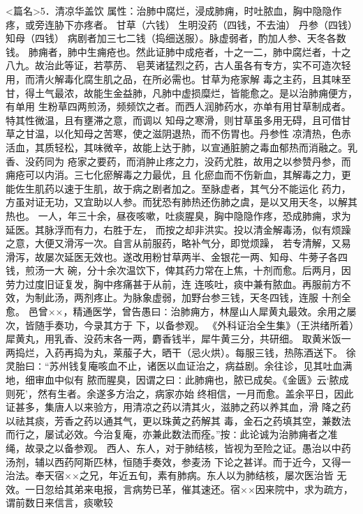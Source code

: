 \documentclass[a4paper,12pt,UTF8,twoside]{ctexbook}
\begin{document}
<篇名>5．清凉华盖饮
属性：治肺中腐烂，浸成肺痈，时吐脓血，胸中隐隐作疼，或旁连胁下亦疼者。 
甘草（六钱） 生明没药（四钱，不去油） 丹参（四钱） 知母（四钱） 
病剧者加三七二钱（捣细送服）。脉虚弱者，酌加人参、天冬各数钱。 
肺痈者，肺中生痈疮也。然此证肺中成疮者，十之一二，肺中腐烂者，十之八九。故治此等证，若葶苈、 
皂荚诸猛烈之药，古人虽各有专方，实不可造次轻用，而清火解毒化腐生肌之品，在所必需也。甘草为疮家解 
毒之主药，且其味至甘，得土气最浓，故能生金益肺，凡肺中虚损糜烂，皆能愈之。是以治肺痈便方，有单用 
生粉草四两煎汤，频频饮之者。而西人润肺药水，亦单有用甘草制成者。特其性微温，且有壅滞之意，而调以 
知母之寒滑，则甘草虽多用无碍，且可借甘草之甘温，以化知母之苦寒，使之滋阴退热，而不伤胃也。丹参性 
凉清热，色赤活血，其质轻松，其味微辛，故能上达于肺，以宣通脏腑之毒血郁热而消融之。乳香、没药同为 
疮家之要药，而消肿止疼之力，没药尤胜，故用之以参赞丹参，而痈疮可以内消。三七化瘀解毒之力最优，且 
化瘀血而不伤新血，其解毒之力，更能佐生肌药以速于生肌，故于病之剧者加之。至脉虚者，其气分不能运化 
药力，方虽对证无功，又宜助以人参。而犹恐有肺热还伤肺之虞，是以又用天冬，以解其热也。 
一人，年三十余，昼夜咳嗽，吐痰腥臭，胸中隐隐作疼，恐成肺痈，求为延医。其脉浮而有力，右胜于左， 
而按之却非洪实。投以清金解毒汤，似有烦躁之意，大便又滑泻一次。自言从前服药，略补气分，即觉烦躁， 
若专清解，又易滑泻，故屡次延医无效也。遂改用粉甘草两半、金银花一两、知母、牛蒡子各四钱，煎汤一大 
碗，分十余次温饮下，俾其药力常在上焦，十剂而愈。后两月，因劳力过度旧证复发，胸中疼痛甚于从前，连 
连咳吐，痰中兼有脓血。再服前方不效，为制此汤，两剂疼止。为脉象虚弱，加野台参三钱，天冬四钱，连服 
十剂全愈。 
邑曾××，精通医学，曾告愚曰∶治肺痈方，林屋山人犀黄丸最效。余用之屡次，皆随手奏功，今录其方于 
下，以备参观。 
《外科证治全生集》（王洪绪所着）犀黄丸，用乳香、没药末各一两，麝香钱半，犀牛黄三分，共研细。 
取黄米饭一两捣烂，入药再捣为丸，莱菔子大，晒干（忌火烘）。每服三钱，热陈酒送下。 
徐灵胎曰∶“苏州钱复庵咳血不止，诸医以血证治之，病益剧。余往诊，见其吐血满地，细审血中似有 
脓而腥臭，因谓之曰∶此肺痈也，脓已成矣。《金匮》云‘脓成则死’，然有生者。余遂多方治之，病家亦始 
终相信，一月而愈。盖余平日，因此证甚多，集唐人以来验方，用清凉之药以清其火，滋肺之药以养其血，滑 
降之药以祛其痰，芳香之药以通其气，更以珠黄之药解其 
毒，金石之药填其空，兼数法而行之，屡试必效。今治复庵，亦兼此数法而痊。”按∶此论诚为治肺痈者之准 
绳，故录之以备参观。 
西人、东人，对于肺结核，皆视为至险之证。愚治以中药汤剂，辅以西药阿斯匹林，恒随手奏效，参麦汤 
下论之甚详。而于近今，又得一治法。奉天宿××之兄，年近五旬，素有肺病。东人以为肺结核，屡次医治皆 
无效。一日忽给其弟来电报，言病势已革，催其速还。宿××因来院中，求为疏方，谓前数日来信言，痰嗽较 
\end{document}
